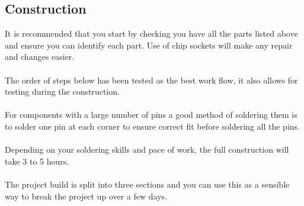 \documentclass{ol-softwaremanual}
\begin{document}
\begin{ffcode}
\subsection{Construction}
It is recommended that you start by checking you have all the parts listed above and ensure you can identify each part. Use of chip sockets will make any repair and changes easier.\\
\\
The order of steps below has been tested as the best work flow, it also allows for testing during the construction.\\
\\
For components with a large number of pins a good method of soldering them is to solder one pin at each corner to ensure correct fit before soldering all the pins.\\
\\
Depending on your soldering skills and pace of work, the full construction will take 3 to 5 hours.\\
\\
The project build is split into three sections and you can use this as a sensible way to break the project up over a few days.
\\


\end{ffcode}
\end{document}
